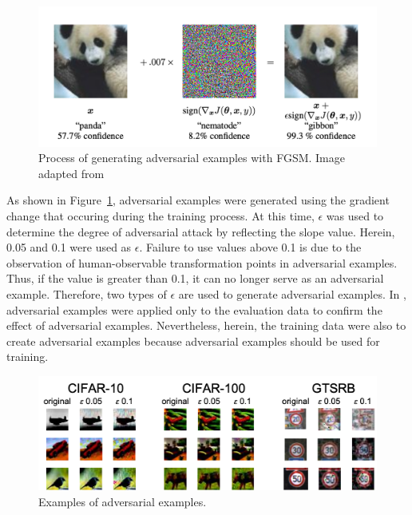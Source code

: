 \documentclass[journal,article,submit,moreauthors,pdftex]{Definitions/mdpi}
\begin{document}
\begin{figure}[H] 
\includegraphics[width=13cm]{Definitions/fgsm.png}
\caption{Process of generating adversarial examples with FGSM. Image adapted from \cite{adversarial-goodfellow}\label{fgsm}}
\end{figure} 

As shown in Figure~\ref{fgsm}, adversarial examples were generated using the gradient change that occuring during the training process.
At this time, \begin{math}\epsilon\end{math} was used to determine the degree of adversarial attack by reflecting the slope value.
Herein, 0.05 and 0.1 were used as \begin{math}\epsilon\end{math}. Failure to use values above 0.1 is due to the observation of human-observable transformation points in adversarial examples.
Thus, if the value is greater than 0.1, it can no longer serve as an adversarial example. Therefore, two types of \begin{math}\epsilon\end{math} are used to generate adversarial examples.
In \cite{adversarial-goodfellow}, adversarial examples were applied only to the evaluation data to confirm the effect of adversarial examples. Nevertheless, herein, the training data were also to create adversarial examples because adversarial examples should be used for training.

\begin{figure}[H]
\includegraphics[width=13 cm]{Definitions/adversarial-dataset.png}
\caption{Examples of adversarial examples.\label{adversarial-examples}}
\end{figure} 
\end{document}
